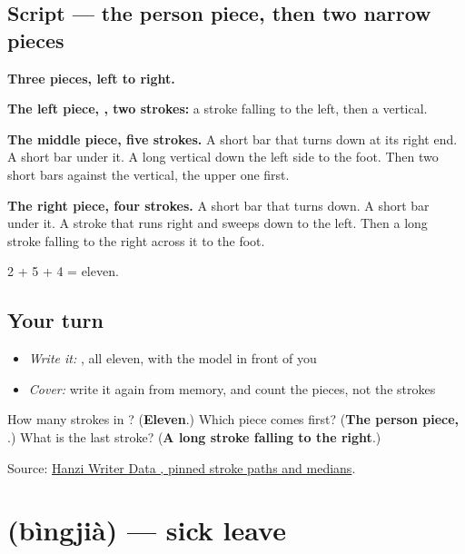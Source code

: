 \subsection*{Script — the person piece, then two narrow pieces}

\begin{quote}
\end{quote}

\textbf{Three pieces, left to right.}

\textbf{The left piece, , two strokes:} a stroke falling to the left, then a vertical.

\textbf{The middle piece, five strokes.} A short bar that turns down at its right end. A short bar under it. A long vertical down the left side to the foot. Then two short bars against the vertical, the upper one first.

\textbf{The right piece, four strokes.} A short bar that turns down. A short bar under it. A stroke that runs right and sweeps down to the left. Then a long stroke falling to the right across it to the foot.

2 + 5 + 4 = eleven.

\subsection*{Your turn}
\begin{itemize}
\raggedright
  \item \emph{Write it:} , all eleven, with the model in front of you
  \item \emph{Cover:} write it again from memory, and count the pieces, not the strokes
\end{itemize}

\begin{tcolorbox}[breakable,colback=teal!4,colframe=teal!35!black,title={Before you move on}]
How many strokes in ? (\textbf{Eleven}.) Which piece comes first? (\textbf{The person piece, }.) What is the last stroke? (\textbf{A long stroke falling to the right}.)

Source: \href{https://raw.githubusercontent.com/chanind/hanzi-writer-data/68d10a4b21150cae5e1ebbd223eed289cf32d90c/data/\%E5\%81\%87.json}{Hanzi Writer Data , pinned stroke paths and medians}.
\end{tcolorbox}
\section[\texorpdfstring{\zh{病假} (bìngjià)}{病假 (bìngjià)}]{ (bìngjià) — sick leave}

